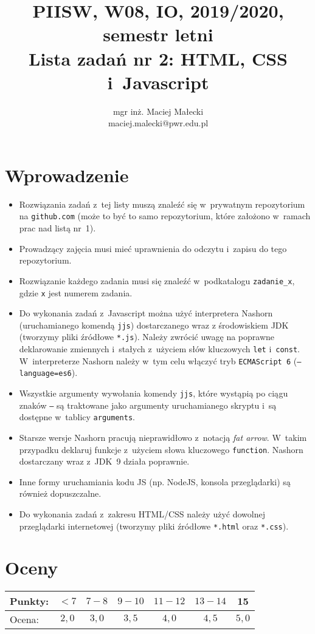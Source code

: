 \documentclass[12pt]{article}
\title{PIISW, W08, IO, 2019/2020, semestr letni\\Lista zadań nr 2: HTML, CSS i~Javascript}
\author{mgr inż. Maciej Małecki\\\small{maciej.malecki@pwr.edu.pl}}
\begin{document}
    \maketitle

    \section*{Wprowadzenie}
    \begin{itemize}
        \item Rozwiązania zadań z~tej listy muszą znaleźć się w~prywatnym repozytorium na \texttt{github.com} (może to być to samo repozytorium, które założono w~ramach prac nad listą nr~1).
        \item Prowadzący zajęcia musi mieć uprawnienia do odczytu i~zapisu do tego repozytorium.
        \item Rozwiązanie każdego zadania musi się znaleźć w~podkatalogu \texttt{zadanie\_x}, gdzie \texttt{x} jest numerem zadania.
        \item Do wykonania zadań z~Javascript można użyć interpretera Nashorn (uruchamianego komendą \texttt{jjs}) dostarczanego wraz z środowiskiem JDK (tworzymy pliki źródłowe \texttt{*.js}). Należy zwrócić uwagę na poprawne deklarowanie zmiennych i~stałych z~użyciem słów kluczowych \texttt{let} i~\texttt{const}. W~interpreterze Nashorn należy w~tym celu włączyć tryb \texttt{ECMAScript~6} (\texttt{--language=es6}).
        \item Wszystkie argumenty wywołania komendy \texttt{jjs}, które wystąpią po ciągu znaków \texttt{--} są traktowane jako argumenty uruchamianego skryptu i~są dostępne w~tablicy \texttt{arguments}.
        \item Starsze wersje Nashorn pracują nieprawidłowo z~notacją \textit{fat arrow}. W~takim przypadku deklaruj funkcje z~użyciem słowa kluczowego \texttt{function}. Nashorn dostarczany wraz z~JDK~9 działa poprawnie.
		\item Inne formy uruchamiania kodu JS (np. NodeJS, konsola przeglądarki) są również dopuszczalne.
        \item Do wykonania zadań z~zakresu HTML/CSS należy użyć dowolnej przeglądarki internetowej (tworzymy pliki źródłowe \texttt{*.html} oraz \texttt{*.css}).
    \end{itemize}

    \section*{Oceny}
    \begin{tabular}{|l|c|c|c|c|c|c|}
        \hline
        Punkty: & $<7$ & $7-8$ & $9-10$ & $11-12$ & $13-14$ & 15\\
        \hline
        Ocena:  & $2,0$ & $3,0$ & $3,5$ & $4,0$ & $4,5$ & $5,0$\\
        \hline
    \end{tabular}
\end{document}
